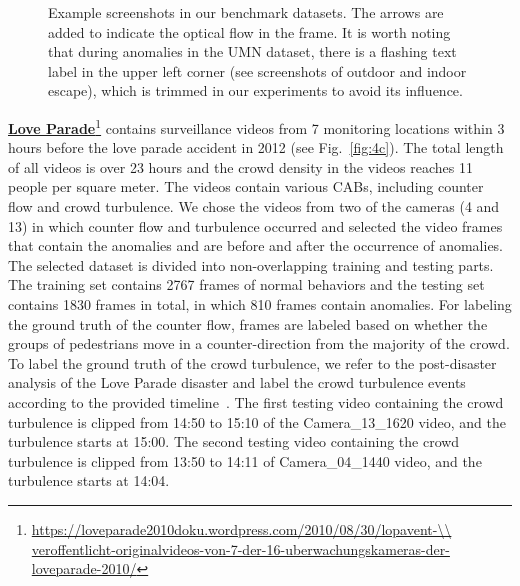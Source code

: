 \documentclass[journal]{IEEEtran}
\begin{document}
\begin{figure}[t]
\centering
    
    
    
    
    \caption{
Example screenshots in our benchmark datasets. The arrows are added to indicate the optical flow in the frame. It is worth noting that during anomalies in the UMN dataset, there is a flashing text label in the upper left corner (see screenshots of outdoor and indoor escape), which is trimmed in our experiments to avoid its influence.
}
\label{fig:data}
\end{figure}

\vskip 0.1in
\noindent\underline{\textbf{Love Parade}}\footnote{\url{https://loveparade2010doku.wordpress.com/2010/08/30/lopavent-\\ veroffentlicht-originalvideos-von-7-der-16-uberwachungskameras-der-loveparade-2010/}} contains surveillance videos from 7 monitoring locations within 3 hours before the love parade accident in 2012 (see Fig.~\ref{fig:4c}). The total length of all videos is over 23 hours and the crowd density in the videos reaches 11 people per square meter. The videos contain various CABs, including counter flow and crowd turbulence. We chose the videos from two of the cameras (4 and 13) in which counter flow and turbulence occurred and selected the video frames that contain the anomalies and are before and after the occurrence of anomalies. The selected dataset is divided into non-overlapping training and testing parts. The training set contains 2767 frames of normal behaviors and the testing set contains 1830 frames in total, in which 810 frames contain anomalies. For labeling the ground truth of the counter flow, frames are labeled based on whether the groups of pedestrians move in a counter-direction from the majority of the crowd. To label the ground truth of the crowd turbulence, we refer to the post-disaster analysis of the Love Parade disaster and label the crowd turbulence events according to the provided timeline~\cite{helbing2012crowd}.
The first testing video containing the crowd turbulence is clipped from 14:50 to 15:10 of the Camera\_13\_1620 video, and the turbulence starts at 15:00. The second testing video containing the crowd turbulence is clipped from 13:50 to 14:11 of Camera\_04\_1440 video, and the turbulence starts at 14:04.
\end{document}

